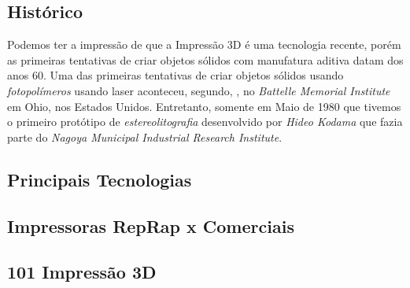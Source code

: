 \subsection{Histórico}
Podemos ter a impressão de que a Impressão 3D é uma tecnologia recente, porém as primeiras
tentativas de criar objetos sólidos com manufatura aditiva datam dos anos 60.
Uma das primeiras tentativas de criar objetos sólidos usando \textit{fotopolímeros} usando laser
aconteceu, segundo, \citet{terry2016}, no \textit{Battelle Memorial Institute} em Ohio, nos Estados Unidos.
Entretanto, somente em Maio de 1980 que tivemos o primeiro protótipo de \textit{estereolitografia}
desenvolvido por \textit{Hideo Kodama} que fazia parte do \textit{Nagoya Municipal Industrial Research Institute}.


\subsection{Principais Tecnologias}
\subsection{Impressoras RepRap x Comerciais}
\subsection{101 Impressão 3D}

